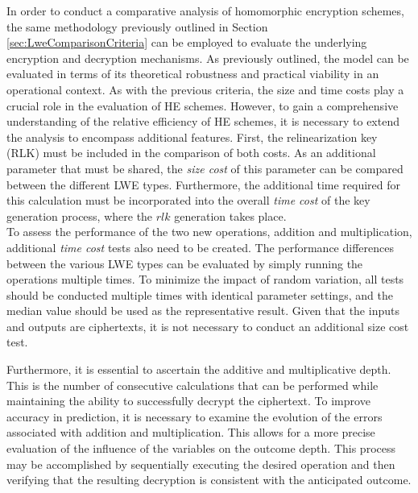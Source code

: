 In order to conduct a comparative analysis of homomorphic encryption schemes, the same methodology previously outlined in Section \ref{sec:LweComparisonCriteria} can be employed to evaluate the underlying encryption and decryption mechanisms. As previously outlined, the model can be evaluated in terms of its theoretical robustness and practical viability in an operational context. As with the previous criteria, the size and time costs play a crucial role in the evaluation of HE schemes. However, to gain a comprehensive understanding of the relative efficiency of HE schemes, it is necessary to extend the analysis to encompass additional features. 
First, the relinearization key (RLK) must be included in the comparison of both costs. As an additional parameter that must be shared, the \textit{size cost} of this parameter can be compared between the different LWE types. Furthermore, the additional time required for this calculation must be incorporated into the overall \textit{time cost} of the key generation process, where the $rlk$ generation takes place.\\
To assess the performance of the two new operations, addition and multiplication, additional \textit{time cost} tests also need to be created. The performance differences between the various LWE types can be evaluated by simply running the operations multiple times. To minimize the impact of random variation, all tests should be conducted multiple times with identical parameter settings, and the median value should be used as the representative result. Given that the inputs and outputs are ciphertexts, it is not necessary to conduct an additional size cost test. 

Furthermore, it is essential to ascertain the additive and multiplicative depth. This is the number of consecutive calculations that can be performed while maintaining the ability to successfully decrypt the ciphertext. To improve accuracy in prediction, it is necessary to examine the evolution of the errors associated with addition and multiplication. This allows for a more precise evaluation of the influence of the variables on the outcome depth. This process may be accomplished by sequentially executing the desired operation and then verifying that the resulting decryption is consistent with the anticipated outcome.
